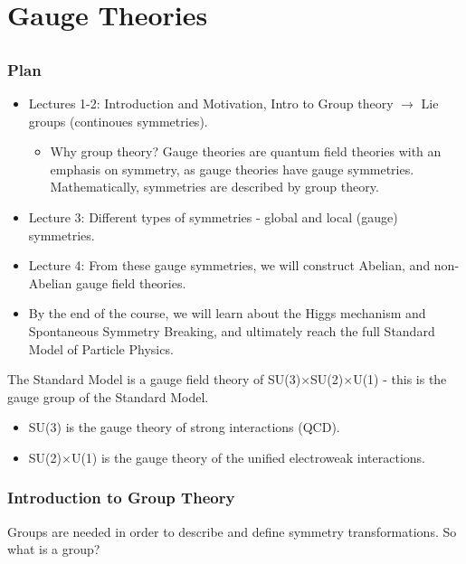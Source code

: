 \documentclass[relqm.tex]{subfiles}
\begin{document}
\part{Gauge Theories}
\chapter{}
\section{Plan}
\begin{itemize}
    \item Lectures 1-2: Introduction and Motivation, Intro to Group theory $\to$ Lie groups (continoues symmetries).
        \begin{itemize}
            \item Why group theory? Gauge theories are quantum field theories with an emphasis on symmetry, as gauge theories have gauge symmetries. Mathematically, symmetries are described by group theory. 
        \end{itemize}
    \item Lecture 3: Different types of symmetries - global and local (gauge) symmetries. 
    \item Lecture 4: From these gauge symmetries, we will construct Abelian, and non-Abelian gauge field theories. 
    \item By the end of the course, we will learn about the Higgs mechanism and Spontaneous Symmetry Breaking, and ultimately reach the full Standard Model of Particle Physics.
\end{itemize}
The Standard Model is a gauge field theory of SU(3)$\times$SU(2)$\times$U(1) - this is the gauge group of the Standard Model. 
\begin{itemize}
    \item SU(3) is the gauge theory of strong interactions (QCD).
    \item SU(2)$\times$U(1) is the gauge theory of the unified electroweak interactions.
\end{itemize}

\section{Introduction to Group Theory}
Groups are needed in order to describe and define symmetry transformations. 
So what is a group?
\end{document}
